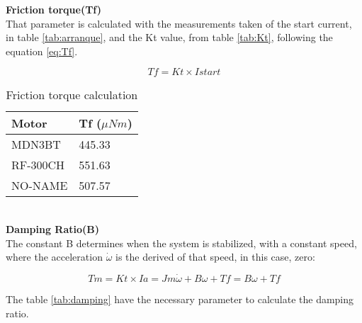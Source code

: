 \textbf{Friction torque(Tf)} \\
That parameter is calculated with the measurements taken of the start current, in table \ref{tab:arranque}, and the Kt value, from table \ref{tab:Kt}, following the equation \ref{eq:Tf}.

\begin{equation}   
Tf= Kt \times Istart
\end{equation}

\begin{table}[H]

\centering
\begin{tabular}{ | l | l |}
\hline\hline
	\textbf{Motor} & \textbf{Tf ($\mu Nm$)} \\ \hline
	MDN3BT & 445.33 \\ \hline
RF-300CH & 551.63 \\ \hline
NO-NAME & 507.57\\ \hline\hline 
\end{tabular}
\caption{Friction torque calculation} \label{tab:Tf}
\end{table}\\

\textbf{Damping Ratio(B)} \\
The constant B determines when the system is stabilized, with a constant speed, where the acceleration $\dot{\omega}$ is the derived of that speed, in this case, zero: 

\begin{equation}   
Tm= Kt \times Ia=Jm \dot{\omega}+B\omega+Tf=B\omega+Tf
\end{equation}

The table \ref{tab:damping} have the necessary parameter to calculate the damping ratio.


